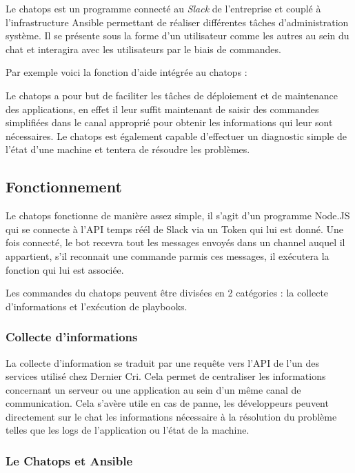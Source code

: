 Le chatops est un programme connecté au \emph{Slack} de l'entreprise et
couplé à l'infrastructure Ansible permettant de réaliser différentes
tâches d'administration système. Il se présente sous la forme d'un
utilisateur comme les autres au sein du chat et interagira avec les
utilisateurs par le biais de commandes.

\bigskip

Par exemple voici la fonction d'aide intégrée au chatops :

\bigskip

Le chatops a pour but de faciliter les tâches de déploiement et de
maintenance des applications, en effet il leur suffit maintenant de
saisir des commandes simplifiées dans le canal approprié pour obtenir
les informations qui leur sont nécessaires. Le chatops est également
capable d'effectuer un diagnostic simple de l'état d'une machine et
tentera de résoudre les problèmes.

\newpage

\subsection{Fonctionnement}\label{fonctionnement}

Le chatops fonctionne de manière assez simple, il s'agit d'un programme
Node.JS qui se connecte à l'API temps réél de Slack via un Token qui lui
est donné. Une fois connecté, le bot recevra tout les messages envoyés
dans un channel auquel il appartient, s'il reconnait une commande parmis
ces messages, il exécutera la fonction qui lui est associée.

Les commandes du chatops peuvent être divisées en 2 catégories : la
collecte d'informations et l'exécution de playbooks.

\subsubsection{Collecte d'informations}\label{collecte-dinformations}

La collecte d'information se traduit par une requête vers l'API de l'un
des services utilisé chez Dernier Cri. Cela permet de centraliser les
informations concernant un serveur ou une application au sein d'un même
canal de communication. Cela s'avère utile en cas de panne, les
développeurs peuvent directement sur le chat les informations nécessaire
à la résolution du problème telles que les logs de l'application ou
l'état de la machine.

\subsubsection{Le Chatops et Ansible}\label{le-chatops-et-ansible}

